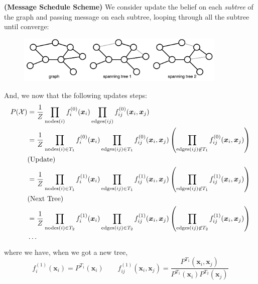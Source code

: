 \begin{remark}{\textbf{(Message Schedule Scheme)}}
    We consider update the belief on each \emph{subtree} of the graph and passing message on each subtree, looping through all the subtree until converge:
    \begin{figure}[H]
        \centering
        \includegraphics[width=10cm]{img/img16.png}
    \end{figure}  
    And, we now that the following updates steps:
    \begin{equation*}
    \begin{aligned}
        P(\mathcal{X}) 
        &= \frac{1}{Z}\prod_{\operatorname{nodes}(i)} f^{(0)}_i(\boldsymbol x_i)\prod_{\operatorname{edges}(ij)} f^{(0)}_{ij}(\boldsymbol x_i, \boldsymbol x_j) \\
        &= \frac{1}{Z}\prod_{\operatorname{nodes}(i) \in T_1} f^{(0)}_i(\boldsymbol x_i)\prod_{\operatorname{edges}(ij) \in T_1} f^{(0)}_{ij}(\boldsymbol x_i, \boldsymbol x_j)\left( \prod_{\operatorname{edges}(ij) \not\in T_1} f^{(0)}_{ij}(\boldsymbol x_i, \boldsymbol x_j) \right) \\
        &\text{(Update)} \\
        &= \frac{1}{Z}\prod_{\operatorname{nodes}(i) \in T_1} f^{(1)}_i(\boldsymbol x_i)\prod_{\operatorname{edges}(ij) \in T_1} f^{(1)}_{ij}(\boldsymbol x_i, \boldsymbol x_j)\left( \prod_{\operatorname{edges}(ij) \not\in T_1} f^{(1)}_{ij}(\boldsymbol x_i, \boldsymbol x_j) \right) \\
        &\text{(Next Tree)} \\
        &= \frac{1}{Z}\prod_{\operatorname{nodes}(i) \in T_2} f^{(1)}_i(\boldsymbol x_i)\prod_{\operatorname{edges}(ij) \in T_2} f^{(1)}_{ij}(\boldsymbol x_i, \boldsymbol x_j)\left( \prod_{\operatorname{edges}(ij) \not\in T_2} f^{(1)}_{ij}(\boldsymbol x_i, \boldsymbol x_j) \right) \\
        &\cdots
    \end{aligned}
    \end{equation*}
    where we have, when we got a new tree, 
    \begin{equation*}
        f^{(1)}_i(\boldsymbol x_i) = P^{T_1}(\boldsymbol x_i)\qquad f^{(1)}_{ij}(\boldsymbol x_i, \boldsymbol x_j) = \frac{P^{T_1}(\boldsymbol x_i, \boldsymbol x_j)}{P^{T_1}(\boldsymbol x_i)P^{T_2}(\boldsymbol x_j)} 

\end{equation*}
\end{remark}
